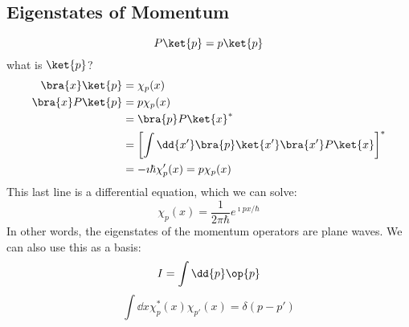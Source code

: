 \documentclass[a4paper,twoside,master.tex]{subfiles}
\begin{document}
\subsection{Eigenstates of Momentum}
\label{sub:eigenstates_of_momentum}

\begin{equation}
    P \ket{p} = p \ket{p} 
\end{equation}
what is $ \ket{p} $?
\begin{align}
    \bra{x} \ket{p} &= \chi_p(x)\\
    \bra{x} P \ket{p} &= p \chi_p(x)\\
    &= \bra{p} P \ket{x}^*\\
    &= \left[ \int \dd{x'} \bra{p} \ket{x'} \bra{x'} P \ket{x} \right]^*\\
    &= -\imath\hbar \chi'_p(x) = p \chi_p(x)
\end{align}
This last line is a differential equation, which we can solve:
\begin{equation}
    \chi_p(x) = \frac{1}{2 \pi\hbar} e^{\imath p x / \hbar}
\end{equation}
In other words, the eigenstates of the momentum operators are plane waves. We can also use this as a basis:
\begin{equation}
    I = \int \dd{p} \op{p}
\end{equation}
\begin{equation}
    \int \dd{x} \chi^*_{p} (x) \chi_{p'} (x) = \delta(p-p')
\end{equation}
\end{document}
